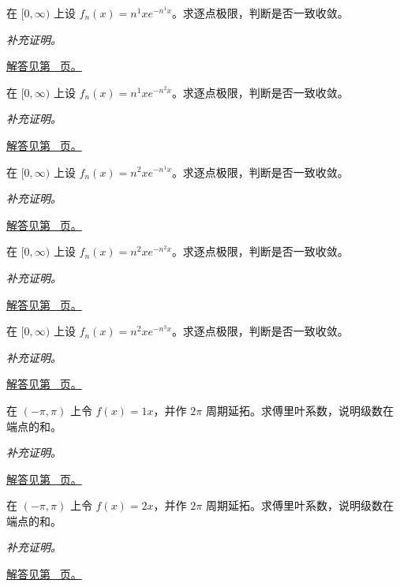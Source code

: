 \documentclass[UTF8,12pt,a4paper,fontset=fandol]{ctexart}
\begin{document}
\begin{example}[移动峰值的函数列]\label{ex:c28q8}
在 $[0,\infty)$ 上设 $f_n(x)=n^{1}x e^{-n^{1}x}$。求逐点极限，判断是否一致收敛。
\par\textit{补充证明。}\par\hyperref[ans:c28q8]{解答见第~\pageref{ans:c28q8} 页。}
\end{example}
\begin{example}[移动峰值的函数列]\label{ex:c28q9}
在 $[0,\infty)$ 上设 $f_n(x)=n^{1}x e^{-n^{2}x}$。求逐点极限，判断是否一致收敛。
\par\textit{补充证明。}\par\hyperref[ans:c28q9]{解答见第~\pageref{ans:c28q9} 页。}
\end{example}
\begin{example}[移动峰值的函数列]\label{ex:c28q10}
在 $[0,\infty)$ 上设 $f_n(x)=n^{2}x e^{-n^{1}x}$。求逐点极限，判断是否一致收敛。
\par\textit{补充证明。}\par\hyperref[ans:c28q10]{解答见第~\pageref{ans:c28q10} 页。}
\end{example}
\begin{example}[移动峰值的函数列]\label{ex:c28q11}
在 $[0,\infty)$ 上设 $f_n(x)=n^{2}x e^{-n^{2}x}$。求逐点极限，判断是否一致收敛。
\par\textit{补充证明。}\par\hyperref[ans:c28q11]{解答见第~\pageref{ans:c28q11} 页。}
\end{example}
\begin{example}[移动峰值的函数列]\label{ex:c28q12}
在 $[0,\infty)$ 上设 $f_n(x)=n^{2}x e^{-n^{3}x}$。求逐点极限，判断是否一致收敛。
\par\textit{补充证明。}\par\hyperref[ans:c28q12]{解答见第~\pageref{ans:c28q12} 页。}
\end{example}
\begin{example}[锯齿函数的傅里叶系数]\label{ex:c28q13}
在 $(-\pi,\pi)$ 上令 $f(x)=1x$，并作 $2\pi$ 周期延拓。求傅里叶系数，说明级数在端点的和。
\par\textit{补充证明。}\par\hyperref[ans:c28q13]{解答见第~\pageref{ans:c28q13} 页。}
\end{example}
\begin{example}[锯齿函数的傅里叶系数]\label{ex:c28q14}
在 $(-\pi,\pi)$ 上令 $f(x)=2x$，并作 $2\pi$ 周期延拓。求傅里叶系数，说明级数在端点的和。
\par\textit{补充证明。}\par\hyperref[ans:c28q14]{解答见第~\pageref{ans:c28q14} 页。}
\end{example}
\end{document}
